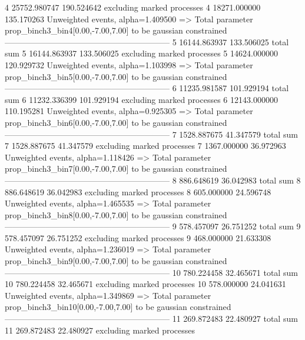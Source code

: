 4          25752.980747    190.524642      excluding marked processes    
4          18271.000000    135.170263      Unweighted events, alpha=1.409500
  => Total parameter prop_binch3_bin4[0.00,-7.00,7.00] to be gaussian constrained
------------------------------------------------------------
5          16144.863937    133.506025      total sum                     
5          16144.863937    133.506025      excluding marked processes    
5          14624.000000    120.929732      Unweighted events, alpha=1.103998
  => Total parameter prop_binch3_bin5[0.00,-7.00,7.00] to be gaussian constrained
------------------------------------------------------------
6          11235.981587    101.929194      total sum                     
6          11232.336399    101.929194      excluding marked processes    
6          12143.000000    110.195281      Unweighted events, alpha=0.925305
  => Total parameter prop_binch3_bin6[0.00,-7.00,7.00] to be gaussian constrained
------------------------------------------------------------
7          1528.887675     41.347579       total sum                     
7          1528.887675     41.347579       excluding marked processes    
7          1367.000000     36.972963       Unweighted events, alpha=1.118426
  => Total parameter prop_binch3_bin7[0.00,-7.00,7.00] to be gaussian constrained
------------------------------------------------------------
8          886.648619      36.042983       total sum                     
8          886.648619      36.042983       excluding marked processes    
8          605.000000      24.596748       Unweighted events, alpha=1.465535
  => Total parameter prop_binch3_bin8[0.00,-7.00,7.00] to be gaussian constrained
------------------------------------------------------------
9          578.457097      26.751252       total sum                     
9          578.457097      26.751252       excluding marked processes    
9          468.000000      21.633308       Unweighted events, alpha=1.236019
  => Total parameter prop_binch3_bin9[0.00,-7.00,7.00] to be gaussian constrained
------------------------------------------------------------
10         780.224458      32.465671       total sum                     
10         780.224458      32.465671       excluding marked processes    
10         578.000000      24.041631       Unweighted events, alpha=1.349869
  => Total parameter prop_binch3_bin10[0.00,-7.00,7.00] to be gaussian constrained
------------------------------------------------------------
11         269.872483      22.480927       total sum                     
11         269.872483      22.480927       excluding marked processes    
